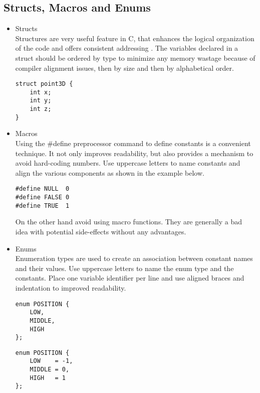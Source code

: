 \documentclass[11pt]{article}
\begin{document}
\subsection{Structs, Macros and Enums}
\begin{itemize}
	\item Structs\\
	Structures are very useful feature in C, that enhances the logical organization of the code and offers consistent addressing \cite{nasa_style1994}. The variables declared in a struct should be ordered by type to minimize any memory wastage because of compiler alignment issues, then by size and then by alphabetical order.
	
\begin{Verbatim}
struct point3D {
	int x;
	int y;
	int z;
}	
\end{Verbatim}
	
	\item Macros\\
	Using the \#define preprocessor command to define constants is a convenient technique. It not only improves readability, but also provides a mechanism to avoid hard-coding numbers. Use uppercase letters to name constants and align the various components as shown in the example below.

\begin{Verbatim}
#define NULL  0
#define FALSE 0
#define TRUE  1
\end{Verbatim}
	
	On the other hand avoid using macro functions. They are generally a bad idea with potential side-effects without any advantages.
	
	\item Enums\\
	Enumeration types are used to create an association between constant names and their values. Use uppercase letters to name the enum type and the constants. Place one variable identifier per line and use aligned braces and indentation to improved readability.

\begin{minipage}[t]{0.5\textwidth}
\begin{Verbatim}
enum POSITION {
	LOW,
	MIDDLE,
	HIGH
};
\end{Verbatim}
\end{minipage}%
\begin{minipage}[t]{0.5\textwidth}
\begin{Verbatim}
enum POSITION {
	LOW    = -1,
	MIDDLE = 0,
	HIGH   = 1
};	
\end{Verbatim}
\end{minipage}

\end{itemize}
\end{document}
